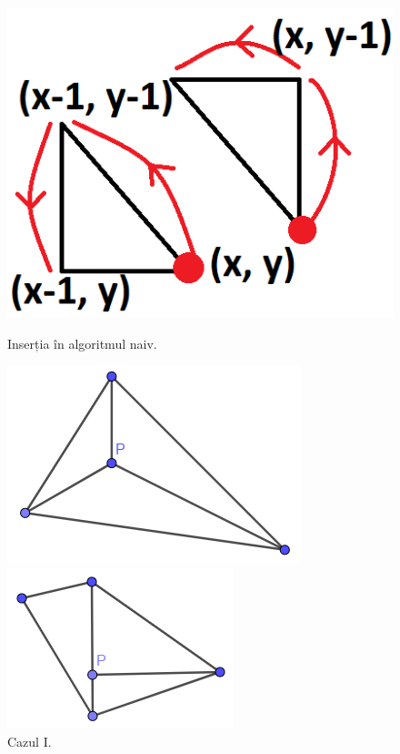 \documentclass[12pt]{article}
\begin{document}
\begin{figure}[!htb]
	\begin{minipage}{0.24\textwidth}
		\centering
		\includegraphics[width=.95\linewidth]{NaivaOrdine.PNG}
		\caption{Inserția în algoritmul naiv.}\label{fig:fig12}
	\end{minipage}\hfill
	\begin{minipage}{0.24\textwidth}
		\centering
		\includegraphics[width=.95\linewidth]{cazi.png}
		\caption{Cazul I.}\label{fig:fig13}
	\end{minipage}\hfill
        \begin{minipage}{0.24\textwidth}
		\centering
		\includegraphics[width=.95\linewidth]{cazii.png}

\end{minipage}
\end{figure}
\end{document}
